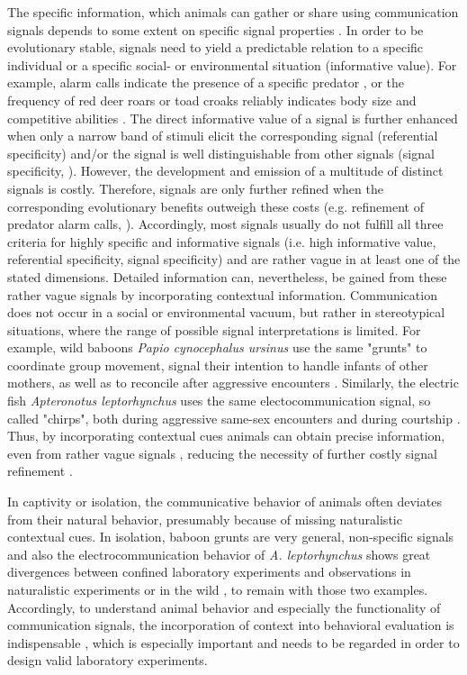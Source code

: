 \documentclass[11pt,pdftex]{article}
\newcommand{\Lepto}{\textit{Apteronotus leptorhynchus}}
\newcommand{\lepto}{\textit{A. leptorhynchus}}
\begin{document}
The specific information, which animals can gather or share using communication signals depends to some extent on specific signal properties \citep{Seyfarth2003}. In order to be evolutionary stable, signals need to yield a predictable relation to a specific individual or a specific social- or environmental situation (informative value). For example, alarm calls indicate the presence of a specific predator \citep{Seyfarth1980}, or the frequency of red deer roars or toad croaks reliably indicates body size and competitive abilities \citep{Davies1978, Reby2005}. The direct informative value of a signal is further enhanced when only a narrow band of stimuli elicit the corresponding signal (referential specificity) and/or the signal is well distinguishable from other signals (signal specificity, \citealp{Seyfarth2003}). However, the development and emission of a multitude of distinct signals is costly. Therefore, signals are only further refined when the corresponding evolutionary benefits outweigh these costs (e.g. refinement of predator alarm calls, \citealp{Schibler2007}). Accordingly, most signals usually do not fulfill all three criteria for highly specific and informative signals (i.e. high informative value, referential specificity, signal specificity) and are rather vague in at least one of the stated dimensions. Detailed information can, nevertheless, be gained from these rather vague signals by incorporating contextual information. Communication does not occur in a social or environmental vacuum, but rather in stereotypical situations, where the range of possible signal interpretations is limited. For example, wild baboons \textit{Papio cynocephalus ursinus} use the same "grunts" to coordinate group movement, signal their intention to handle infants of other mothers, as well as to reconcile after aggressive encounters \citep{Cheney1995, Rendall1999}. Similarly, the electric fish \Lepto{} uses the same electocommunication signal, so called "chirps", both during aggressive same-sex encounters and during courtship \citep{Henninger2018}. Thus, by incorporating contextual cues animals can obtain precise information, even from rather vague signals \citep{Seyfarth2017}, reducing the necessity of further costly signal refinement \citep{Schibler2007}.

In captivity or isolation, the communicative behavior of animals often deviates from their natural behavior, presumably because of missing naturalistic contextual cues. In isolation, baboon grunts are very general, non-specific signals \citep{Cheney1995, Rendall1999} and also the electrocommunication behavior of \lepto{} shows great divergences between confined laboratory experiments and observations in naturalistic experiments or in the wild \citep{Henninger2018}, to remain with those two examples. Accordingly, to understand animal behavior and especially the functionality of communication signals, the incorporation of context into behavioral evaluation is indispensable \citep{Seyfarth2017}, which is especially important and needs to be regarded in order to design valid laboratory experiments.
\end{document}
